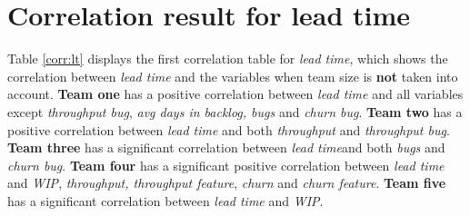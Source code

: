 \documentclass[UKenglish]{ifimaster}  %
\begin{document}
\section{Correlation result for lead time}
\label{sec:corr:lt}
Table \ref{corr:lt} displays the first correlation table for \textit{lead time}, which shows the correlation between \textit{lead time} and the variables when team size is \textbf{not} taken into account. \textbf{Team one} has a positive correlation between \textit{lead time} and all variables except \textit{throughput bug}, \textit{avg days in backlog, bugs} and \textit{churn bug}. \textbf{Team two} has a positive correlation between \textit{lead time} and both \textit{throughput} and \textit{throughput bug}. \textbf{Team three} has a significant correlation between \textit{lead time}and both \textit{bugs} and \textit{churn bug}. \textbf{Team four} has a significant positive correlation between \textit{lead time} and \textit{WIP}, \textit{throughput, throughput feature},  \textit{churn} and \textit{churn feature}. \textbf{Team five} has a significant correlation  between \textit{lead time} and \textit{WIP}.
\end{document}
